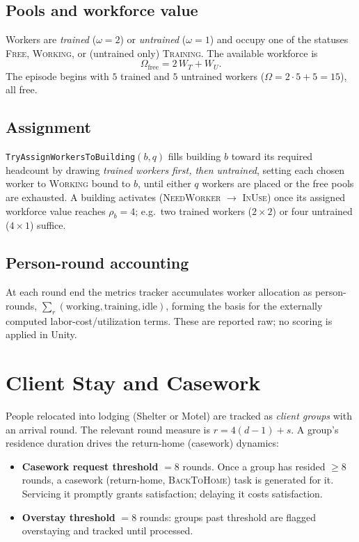 \documentclass[11pt]{article}
\newcommand{\code}[1]{\texttt{\small #1}}
\newcommand{\Round}{r}
\newcommand{\Day}{d}
\newcommand{\seg}{s}
\begin{document}
\subsection{Pools and workforce value}
Workers are \emph{trained} ($\omega=2$) or \emph{untrained} ($\omega=1$) and
occupy one of the statuses \textsc{Free}, \textsc{Working}, or (untrained only)
\textsc{Training}. The available workforce is
\[
  \Omega_{\text{free}} = 2\,W_T + W_U .
\]
The episode begins with $5$ trained and $5$ untrained workers
($\Omega = 2\cdot5 + 5 = 15$), all free.

\subsection{Assignment}
\code{TryAssignWorkersToBuilding}$(b, q)$ fills building $b$ toward its required
headcount by drawing \emph{trained workers first, then untrained}, setting each
chosen worker to \textsc{Working} bound to $b$, until either $q$ workers are
placed or the free pools are exhausted. A building activates
(\textsc{NeedWorker} $\to$ \textsc{InUse}) once its assigned workforce value
reaches $\rho_b = 4$; e.g.\ two trained workers ($2\times2$) or four untrained
($4\times1$) suffice.

\subsection{Person-round accounting}
At each round end the metrics tracker accumulates worker allocation as
person-rounds, $\sum_\Round(\text{working}, \text{training}, \text{idle})$,
forming the basis for the externally computed labor-cost/utilization terms.
These are reported raw; no scoring is applied in Unity.

\section{Client Stay and Casework}
\label{sec:casework}

People relocated into lodging (Shelter or Motel) are tracked as \emph{client
groups} with an arrival round. The relevant round measure is
$\Round = 4(\Day-1) + \seg$. A group's residence duration drives the
return-home (casework) dynamics:

\begin{itemize}[nosep]
\item \textbf{Casework request threshold} $= 8$ rounds. Once a group has resided
  $\geq 8$ rounds, a casework (return-home, \textsc{BackToHome}) task is
  generated for it. Servicing it promptly grants satisfaction; delaying it costs
  satisfaction.
\item \textbf{Overstay threshold} $= 8$ rounds: groups past threshold are flagged
  overstaying and tracked until processed.
\end{itemize}
\end{document}
